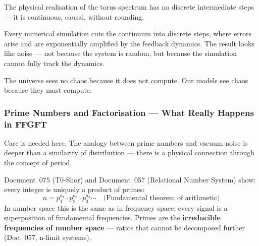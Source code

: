 \begin{keypoint}
The physical realisation of the torus spectrum has no discrete intermediate steps —
it is continuous, causal, without rounding.

Every numerical simulation cuts the continuum into discrete steps, where errors
arise and are exponentially amplified by the feedback dynamics. The result looks
like noise — not because the system is random, but because the simulation cannot
fully track the dynamics.

The universe sees no chaos because it does not compute.
Our models see chaos because they must compute.
\end{keypoint}

\subsubsection*{Prime Numbers and Factorisation — What Really Happens in FFGFT}

Care is needed here. The analogy between prime numbers and vacuum noise is deeper
than a similarity of distribution — there is a physical connection through the
concept of period.

Document~075 (T0-Shor) and Document~057 (Relational Number System) show:
every integer is uniquely a product of primes:
\begin{equation}
    n = p_1^{a_1} \cdot p_2^{a_2} \cdot p_3^{a_3} \cdots
    \quad \text{(Fundamental theorem of arithmetic)}
\end{equation}
In number space this is the same as in frequency space: every signal is a
superposition of fundamental frequencies. Primes are the \textbf{irreducible
frequencies of number space} — ratios that cannot be decomposed further
(Doc.~057, n-limit systems).

